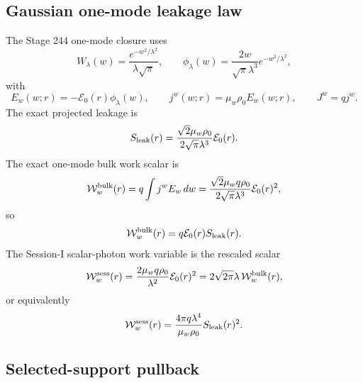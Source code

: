 \subsection{Gaussian one-mode leakage law}
\label{subsec:part08-stage244-gaussian-leakage}

The Stage 244 one-mode closure uses
\begin{equation}
\label{eq:part08-stage244-wlambda}
W_\lambda(w)=\frac{e^{-w^2/\lambda^2}}{\lambda\sqrt\pi},
\qquad
\phi_\lambda(w)=\frac{2w}{\sqrt\pi\lambda^3}e^{-w^2/\lambda^2},
\end{equation}
with
\begin{equation}
\label{eq:part08-stage244-ew-jw}
E_w(w;r)=-\mathcal E_0(r)\phi_\lambda(w),
\qquad
j^w(w;r)=\mu_w\rho_0E_w(w;r),
\qquad
J^w=qj^w.
\end{equation}
The exact projected leakage is
\begin{equation}
\label{eq:part08-stage244-sleak-e0}
S_{\rm leak}(r)
=
\frac{\sqrt2\mu_w\rho_0}{2\sqrt\pi\lambda^3}\mathcal E_0(r).
\end{equation}
The exact one-mode bulk work scalar is
\begin{equation}
\label{eq:part08-stage244-bulk-work}
\mathcal W_w^{\rm bulk}(r)
=
q\int j^wE_w\,dw
=
\frac{\sqrt2\mu_wq\rho_0}{2\sqrt\pi\lambda^3}\mathcal E_0(r)^2,
\end{equation}
so
\begin{equation}
\label{eq:part08-stage244-work-leak-relation}
\mathcal W_w^{\rm bulk}(r)=q\mathcal E_0(r)S_{\rm leak}(r).
\end{equation}
The Session-I scalar-photon work variable is the rescaled scalar
\begin{equation}
\label{eq:part08-stage244-session-work}
\mathcal W_w^{\rm sess}(r)
=
\frac{2\mu_wq\rho_0}{\lambda^2}\mathcal E_0(r)^2
=
2\sqrt{2\pi}\lambda\,\mathcal W_w^{\rm bulk}(r),
\end{equation}
or equivalently
\begin{equation}
\label{eq:part08-stage244-quadratic-law}
\mathcal W_w^{\rm sess}(r)
=
\frac{4\pi q\lambda^4}{\mu_w\rho_0}S_{\rm leak}(r)^2.
\end{equation}

\subsection{Selected-support pullback}
\label{subsec:part08-stage244-selected-pullback}

